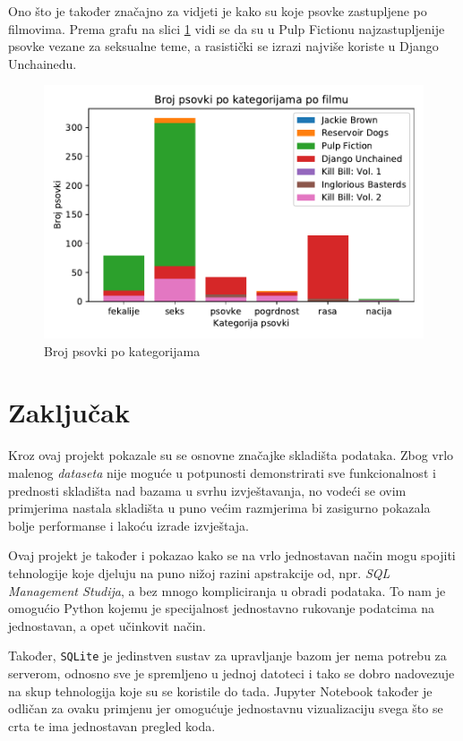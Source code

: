 \documentclass[11pt]{foi}
\begin{document}
Ono što je također značajno za vidjeti je kako su koje psovke zastupljene po
filmovima. Prema grafu na slici \ref{psovke_po_kat_po_film} vidi se da su u
Pulp Fictionu najzastupljenije psovke vezane za seksualne teme, a rasistički
se izrazi najviše koriste u Django Unchainedu.

\begin{figure}[h]
	\centering
	\includegraphics{"slike/kategorije_total_po_filmovima.pdf"}
	\caption{Broj psovki po kategorijama}
	\label{psovke_po_kat_po_film}
\end{figure}

\chapter{Zaključak}

Kroz ovaj projekt pokazale su se osnovne značajke skladišta podataka. Zbog vrlo
malenog \textit{dataseta} nije moguće u potpunosti demonstrirati sve
funkcionalnost i prednosti skladišta nad bazama u svrhu izvještavanja, no
vodeći se ovim primjerima nastala skladišta u puno većim razmjerima bi
zasigurno pokazala bolje performanse i lakoću izrade izvještaja.

Ovaj projekt je također i pokazao kako se na vrlo jednostavan način mogu
spojiti tehnologije koje djeluju na puno nižoj razini apstrakcije od, npr.
\textit{SQL Management Studija}, a bez mnogo kompliciranja u obradi podataka.
To nam je omogućio Python kojemu je specijalnost jednostavno rukovanje
podatcima na jednostavan, a opet učinkovit način.

Također, \texttt{SQLite} je jedinstven sustav za upravljanje bazom jer nema
potrebu za serverom, odnosno sve je spremljeno u jednoj datoteci i tako se
dobro nadovezuje na skup tehnologija koje su se koristile do tada. Jupyter
Notebook također je odličan za ovaku primjenu jer omogućuje jednostavnu
vizualizaciju svega što se crta te ima jednostavan pregled koda.
\end{document}
